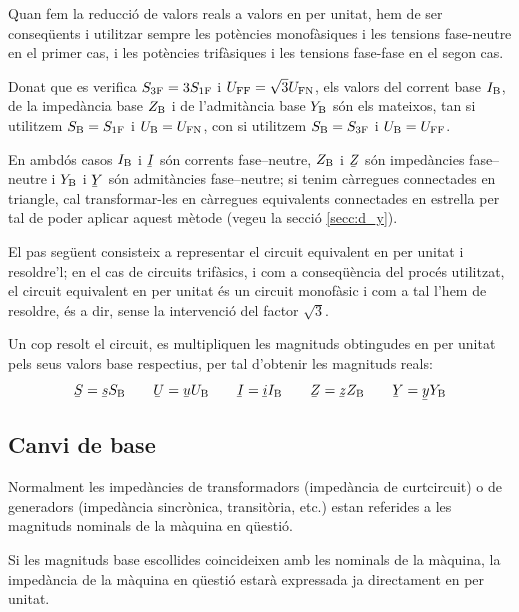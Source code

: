  Quan fem la reducci\'{o} de valors reals a valors en per unitat, hem de ser conseq\"{u}ents i utilitzar sempre les pot\`{e}ncies monof\`{a}siques i les tensions fase-neutre en el primer cas, i les pot\`{e}ncies trif\`{a}siques i les tensions fase-fase en el segon cas.

 Donat que es verifica $S_\mathrm{3F}=3 S_\mathrm{1F}$ i $U_\mathrm{FF}=\sqrt{3}U_\mathrm{FN}$, els valors  del corrent base $I_\mathrm{B}$, de la imped\`{a}ncia base $Z_\mathrm{B}$ i  de l'admit\`{a}ncia base $Y_\mathrm{B}$ s\'{o}n els mateixos, tan si utilitzem $S_\mathrm{B}=S_\mathrm{1F}$ i $U_\mathrm{B}=U_\mathrm{FN}$, con si utilitzem $S_\mathrm{B}=S_\mathrm{3F}$ i $U_\mathrm{B}=U_\mathrm{FF}$.

 En ambd\'{o}s casos $I_\mathrm{B}$ i $\cmplx{I}$ s\'{o}n corrents fase--neutre, $Z_\mathrm{B}$ i $\cmplx{Z}$ s\'{o}n imped\`{a}ncies fase--neutre i $Y_\mathrm{B}$ i $\cmplx{Y}$ s\'{o}n admit\`{a}ncies fase--neutre; si tenim c\`{a}rregues connectades en triangle, cal transformar-les en c\`{a}rregues equivalents connectades en estrella per tal de poder aplicar aquest m\`{e}tode (vegeu la secci\'{o} \ref{secc:d_y}).

El pas seg\"{u}ent consisteix a representar el circuit equivalent en
per unitat i resoldre'l; en el cas de circuits trif\`{a}sics, i com a conseq\"{u}\`{e}ncia del proc\'{e}s utilitzat, el circuit equivalent en per unitat \'{e}s un circuit monof\`{a}sic i com a tal l'hem de resoldre, \'{e}s a dir, sense la intervenci\'{o} del factor $\sqrt{3}$.

Un cop resolt el circuit, es multipliquen les magnituds obtingudes en per unitat pels
seus valors base respectius, per tal d'obtenir les magnituds reals:
\begin{equation}
   \cmplx{S} = \cmplx{s} S\ped{B} \qquad \cmplx{U} = \cmplx{u} U\ped{B} \qquad \cmplx{I} = \cmplx{i} I\ped{B} \qquad \cmplx{Z} = \cmplx{z} Z\ped{B} \qquad \cmplx{Y} = \cmplx{y} Y\ped{B}
\end{equation}

\subsection{Canvi de base}\label{sec:canvi-base} 

Normalment les imped\`{a}ncies de transformadors (imped\`{a}ncia de curtcircuit) o de generadors (imped\`{a}ncia sincr\`{o}nica, transit\`{o}ria, etc.) estan referides a les magnituds nominals de la m\`{a}quina en q\"{u}esti\'{o}.


Si les magnituds base escollides coincideixen amb les nominals de la m\`{a}quina,
la imped\`{a}ncia de la m\`{a}quina en q\"{u}esti\'{o} estar\`{a} expressada ja directament en per unitat.

